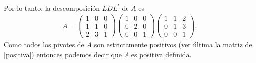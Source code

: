 \documentclass[11pt,letterpaper]{article}
\begin{document}
\begin{enumerate}
\begin{align*}
\end{align*}
Por lo tanto, la descomposición $LDL^t$ de $A$ es
\begin{align*}
A= \begin{pmatrix}
 1 & 0 & 0 \\
 1 & 1 & 0\\
 2 & 3 & 1
\end{pmatrix}\begin{pmatrix}
 1 & 0 & 0 \\
 0 & 2 & 0\\
 0 & 0 & 1
\end{pmatrix}\begin{pmatrix}
 1 & 1 & 2 \\
 0 & 1 & 3\\
 0 & 0 & 1
\end{pmatrix}.
\end{align*}
Como todos los pivotes de $A$ son estrictamente positivos (ver última la matriz de \ref{positiva}) entonces podemos decir que $A$ es positiva definida. \\


\end{enumerate}
\end{document}
